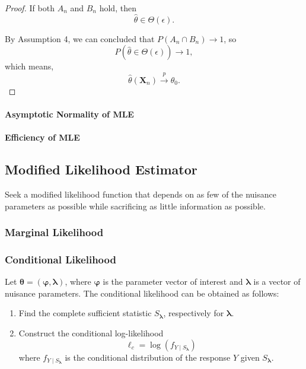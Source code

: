 \begin{proof}
    If both $A_{n}$ and $B_{n}$ hold, then
    \begin{equation*}
        \hat{\theta}\in\Theta(\epsilon).
    \end{equation*}

    By Assumption 4, we can concluded that $P\left(A_{n}\cap B_{n}\right)\rightarrow 1$, so
    \begin{equation*}
        P(\hat{\theta}\in\Theta(\epsilon))\rightarrow 1,
    \end{equation*}
    which means,
    \begin{equation*}
        \hat{\theta}\left(\textbf{X}_{n}\right)\stackrel{p}{\rightarrow}\theta_{0}.
    \end{equation*}
\end{proof}

\paragraph{Asymptotic Normality of MLE}

\paragraph{Efficiency of MLE}

\subsection{Modified Likelihood Estimator}

Seek a modified likelihood function that depends on as few of the nuisance parameters as possible while sacrificing as little information as possible.

\subsubsection{Marginal Likelihood}

\subsubsection{Conditional Likelihood}

Let $\boldsymbol{\theta}=(\boldsymbol{\varphi},\boldsymbol{\lambda})$, where $\boldsymbol{\varphi}$ is the parameter vector of interest and $\boldsymbol{\lambda}$ is a vector of nuisance parameters. The conditional likelihood can be obtained as follows:
\begin{enumerate}
    \item Find the complete sufficient statistic $S_{\boldsymbol{\lambda}}$, respectively for $\boldsymbol{\lambda}$.
    \item  Construct the conditional log-likelihood
          \begin{equation}
              \ell_{c}=\log\left(f_{Y\mid S_{\boldsymbol{\lambda}}}\right)
          \end{equation}
          where $f_{Y\mid S_{\boldsymbol{\lambda}}}$ is the conditional distribution of the response $Y$ given $S_{\boldsymbol{\lambda}}$.
\end{enumerate}

